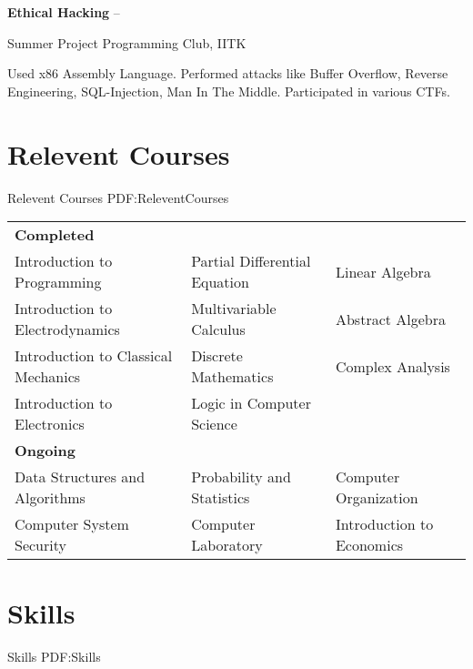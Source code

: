 \documentclass[letterpaper,10pt,oneside]{article}
\begin{document}
\begin{body}
{\textbf{Ethical Hacking}}
\hfill
{} --

\GapNoBreak
\BulletItem
Summer Project Programming Club, IITK
\begin{detail}
\SubBulletItem
Used x86 Assembly Language.
\SubBulletItem
Performed attacks like Buffer Overflow, Reverse Engineering, SQL-Injection, Man In The Middle.
\SubBulletItem
Participated in various CTFs.
\end{detail}

\section
{Relevent Courses}
{Relevent Courses}
{PDF:ReleventCourses}

\begin{tabular}{l l l}
\textbf{{Completed}}\\
\fontsize{10.7pt}{10.6pt}\selectfont Introduction to Programming & \fontsize{10.7pt}{10.6pt}\selectfont Partial Differential Equation &\fontsize{10.7pt}{10.6pt}\selectfont Linear Algebra\\ 
\fontsize{10.7pt}{10.6pt}\selectfont Introduction to Electrodynamics &\fontsize{10.7pt}{10.6pt}\selectfont Multivariable Calculus &\fontsize{10.7pt}{10.6pt}\selectfont Abstract Algebra\\
\fontsize{10.7pt}{10.6pt}\selectfont Introduction to Classical Mechanics &\fontsize{10.7pt}{10.6pt}\selectfont Discrete Mathematics &\fontsize{10.7pt}{10.6pt}\selectfont Complex Analysis\\
\fontsize{10.7pt}{10.6pt}\selectfont Introduction to Electronics &\fontsize{10.7pt}{10.6pt}\selectfont Logic in Computer Science\\
\textbf{{Ongoing}}\\
\fontsize{10.7pt}{10.6pt}\selectfont Data Structures and Algorithms &\fontsize{10.7pt}{10.6pt}\selectfont Probability and Statistics &\fontsize{10.7pt}{10.6pt}\selectfont Computer Organization\\
\fontsize{10.7pt}{10.6pt}\selectfont Computer System Security &\fontsize{10.7pt}{10.6pt}\selectfont Computer Laboratory &\fontsize{10.7pt}{10.6pt}\selectfont Introduction to Economics\\ 
\end{tabular}
 

\section
{Skills}
{Skills}
{PDF:Skills}


\end{body}
\end{document}
